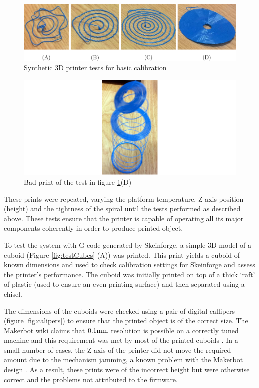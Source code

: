 			\begin{figure}
				\includegraphics[width=1\textwidth]{diagrams/syntheticTests.pdf}
				\caption{Synthetic 3D printer tests for basic calibration}
				\label{fig:syntheticTests}
			\end{figure}
			
			\begin{figure}
				\includegraphics[width=1\textwidth]{diagrams/looseSpiral.pdf}
				\caption{Bad print of the test in figure \ref{fig:syntheticTests}(D)}
				\label{fig:looseSpiral}
			\end{figure}
			
			These prints were repeated, varying the platform temperature, Z-axis
			position (height) and the tightness of the spiral until the tests
			performed as described above. These tests ensure that the printer is
			capable of operating all its major components coherently in order to
			produce printed object.
			
			To test the system with G-code generated by Skeinforge, a simple 3D model
			of a cuboid (Figure \ref{fig:testCubes} (A)) was printed. This print
			yields a cuboid of known dimensions and used to check calibration settings
			for Skeinforge and assess the printer's performance. The cuboid was
			initially printed on top of a thick `raft' of plastic (used to ensure an
			even printing surface) and then separated using a chisel.
			
			The dimensions of the cuboids were checked using a pair of digital
			callipers (figure \ref{fig:calipers}) to ensure that the printed object is
			of the correct size. The Makerbot wiki claims that $0.1\textrm{mm}$ resolution is
			possible on a correctly tuned machine and this requirement was met by most
			of the printed cuboids \cite{makerbotfaq}. In a small number of cases, the
			Z-axis of the printer did not move the required amount due to the
			mechanism jamming, a known problem with the Makerbot design
			\cite{zaxisissue}. As a result, these prints were of the incorrect height
			but were otherwise correct and the problems not attributed to the
			firmware.
			
